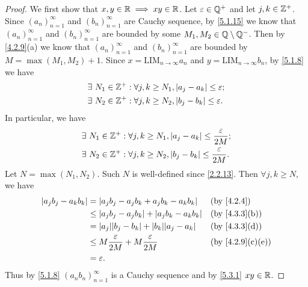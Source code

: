 \begin{proof}
  We first show that \(x, y \in \mathbb{R} \implies xy \in \mathbb{R}\).
  Let \(\varepsilon \in \mathbb{Q}^+\) and let \(j, k \in \mathbb{Z}^+\).
  Since \((a_n)_{n = 1}^\infty\) and \((b_n)_{n = 1}^\infty\) are Cauchy sequence, by \cref{5.1.15} we know that \((a_n)_{n = 1}^\infty\) and \((b_n)_{n = 1}^\infty\) are bounded by some \(M_1, M_2 \in \mathbb{Q} \setminus \mathbb{Q}^-\).
  Then by \cref{4.2.9}(a) we know that \((a_n)_{n = 1}^\infty\) and \((b_n)_{n = 1}^\infty\) are bounded by \(M = \max(M_1, M_2) + 1\).
  Since \(x = \text{LIM}_{n \to \infty} a_n\) and \(y = \text{LIM}_{n \to \infty} b_n\), by \cref{5.1.8} we have
  \begin{align*}
     & \exists\ N_1 \in \mathbb{Z}^+ : \forall j, k \geq N_1, \left\lvert a_j - a_k\right\rvert \leq \varepsilon; \\
     & \exists\ N_2 \in \mathbb{Z}^+ : \forall j, k \geq N_2, \left\lvert b_j - b_k\right\rvert \leq \varepsilon.
  \end{align*}
  In particular, we have
  \begin{align*}
     & \exists\ N_1 \in \mathbb{Z}^+ : \forall j, k \geq N_1, \left\lvert a_j - a_k\right\rvert \leq \dfrac{\varepsilon}{2M}; \\
     & \exists\ N_2 \in \mathbb{Z}^+ : \forall j, k \geq N_2, \left\lvert b_j - b_k\right\rvert \leq \dfrac{\varepsilon}{2M}.
  \end{align*}
  Let \(N = \max(N_1, N_2)\).
  Such \(N\) is well-defined since \cref{2.2.13}.
  Then \(\forall j, k \geq N\), we have
  \begin{align*}
    \abs{a_j b_j - a_k b_k} & = \abs{a_j b_j - a_j b_k + a_j b_k - a_k b_k}              &  & \text{(by \cref{4.2.4})}       \\
                            & \leq \abs{a_j b_j - a_j b_k} + \abs{a_j b_k - a_k b_k}     &  & \text{(by \cref{4.3.3}(b))}    \\
                            & = \abs{a_j} \abs{b_j - b_k} + \abs{b_k} \abs{a_j - a_k}    &  & \text{(by \cref{4.3.3}(d))}    \\
                            & \leq M \dfrac{\varepsilon}{2M} + M \dfrac{\varepsilon}{2M} &  & \text{(by \cref{4.2.9}(c)(e))} \\
                            & = \varepsilon.
  \end{align*}
  Thus by \cref{5.1.8} \((a_n b_n)_{n = 1}^\infty\) is a Cauchy sequence and by \cref{5.3.1} \(xy \in \mathbb{R}\).


\end{proof}
